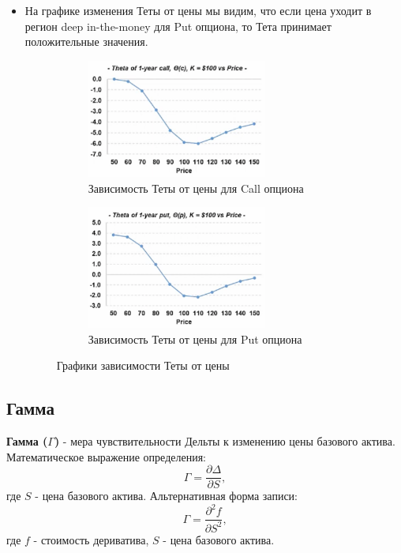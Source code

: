 \documentclass{article}
\begin{document}
\begin{itemize}
\item На графике изменения Теты от цены мы видим, что если цена уходит в регион deep in-the-money для Put опциона, то Тета принимает положительные значения.


\begin{figure}[h]
	\centering
	\begin{subfigure}{.49\textwidth}
		\centering
		\includegraphics[width=0.7\textwidth]{theta-call-price.jpg}
		\caption{Зависимость Теты от цены для Call опциона}
		\label{model}
	\end{subfigure}
	\begin{subfigure}{.5\textwidth}
		\centering
		\includegraphics[width=0.7\textwidth]{theta-put-price.jpg}
		\caption{Зависимость Теты от цены для Put опциона}
		\label{model}
	\end{subfigure}
	
	\caption{Графики зависимости Теты от цены}
	\label{model}
\end{figure}

\end{itemize}

\subsection{Гамма}
 \textbf{Гамма ($\Gamma$) } - мера чувствительности Дельты к изменению цены базового актива. Математическое выражение определения: $$\Gamma = \dfrac{\partial \Delta}{\partial S},$$ где $S$ - цена базового актива. Альтернативная форма записи: $$\Gamma = \dfrac{\partial^2 f}{\partial S^2},$$ где $f$ - стоимость дериватива, $S$ - цена базового актива.
\end{document}
